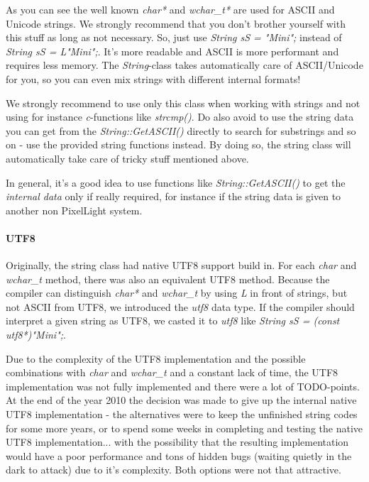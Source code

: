 As you can see the well known \emph{char*} and \emph{wchar\_t*} are used for ASCII and Unicode strings. We strongly recommend that you don't brother yourself with this stuff as long as not necessary. So, just use \emph{String sS = "Mini";} instead of \emph{String sS = L"Mini";}. It's more readable and ASCII is more performant and requires less memory. The \emph{String}-class takes automatically care of ASCII/Unicode for you, so you can even mix strings with different internal formats!

We strongly recommend to use only this class when working with strings and not using for instance \emph{c}-functions like \emph{strcmp()}. Do also avoid to use the string data you can get from the \emph{String::GetASCII()} directly to search for substrings and so on - use the provided string functions instead. By doing so, the string class will automatically take care of tricky stuff mentioned above.

In general, it's a good idea to use functions like \emph{String::GetASCII()} to get the \emph{internal data} only if really required, for instance if the string data is given to another non PixelLight system.


\paragraph{UTF8}
Originally, the string class had native UTF8 support build in. For each \emph{char} and \emph{wchar\_t} method, there was also an equivalent UTF8 method. Because the compiler can distinguish \emph{char*} and \emph{wchar\_t} by using \emph{L} in front of strings, but not ASCII from UTF8, we introduced the \emph{utf8} data type. If the compiler should interpret a given string as UTF8, we casted it to \emph{utf8} like \emph{String sS = (const utf8*)"Mini";}.

Due to the complexity of the UTF8 implementation and the possible combinations with \emph{char} and \emph{wchar\_t} and a constant lack of time, the UTF8 implementation was not fully implemented and there were a lot of TODO-points. At the end of the year 2010 the decision was made to give up the internal native UTF8 implementation - the alternatives were to keep the unfinished string codes for some more years, or to spend some weeks in completing and testing the native UTF8 implementation... with the possibility that the resulting implementation would have a poor performance and tons of hidden bugs (waiting quietly in the dark to attack) due to it's complexity. Both options were not that attractive.

